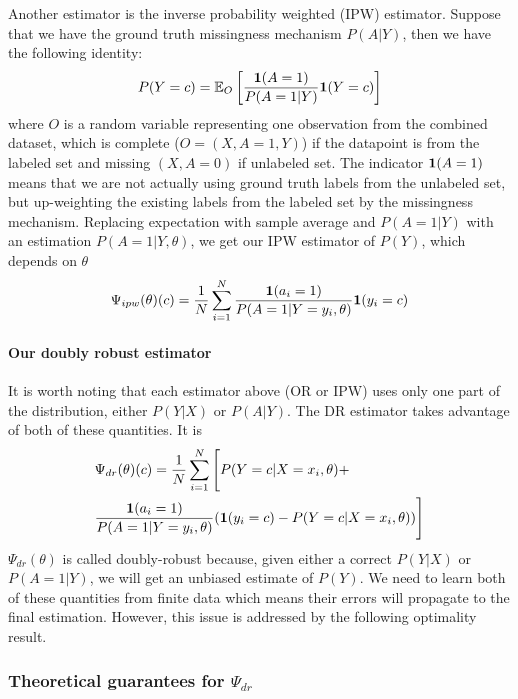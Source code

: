 Another estimator is the inverse probability weighted (IPW) estimator. Suppose that we have the ground truth missingness mechanism $P(A|Y)$, then we have the following identity:
\begin{equation}
P(Y=c) = \mathbb{E}_O\left[\frac{\textbf{1}(A=1)}{P(A=1|Y)} \textbf{1}(Y=c)\right]
\end{equation}
where $O$ is a random variable representing one observation from the combined dataset, which is complete ($O=(X,A=1,Y)$) if the datapoint is from the labeled set and missing $(X,A=0)$ if unlabeled set. The indicator $\textbf{1}(A=1)$ means that we are not actually using ground truth labels from the unlabeled set, but up-weighting the existing labels from the labeled set by the missingness mechanism. Replacing expectation with sample average and $P(A=1|Y)$ with an estimation $P(A=1|Y,\theta)$, we get our IPW estimator of $P(Y)$, which depends on $\theta$
\begin{equation}
\Psi_{ipw}(\theta)(c) = \frac{1}{N}\sum_{i=1}^N \frac{\textbf{1}(a_i=1)}{P(A=1|Y=y_i,\theta)}\textbf{1}(y_i=c)
\end{equation}


\noindent
\vspace*{-.3in}
\paragraph{Our doubly robust estimator}
It is worth noting that each estimator above (OR or IPW) uses only one part of the distribution, either $P(Y|X)$ or $P(A|Y)$. The DR estimator takes advantage of both of these quantities. It is
\vspace*{-.1in}
\begin{equation}
\label{eq:dr}
\begin{aligned}
&\Psi_{dr}(\theta)(c) = \frac{1}{N}\sum_{i=1}^N\Bigg[ P(Y=c|X=x_i,\theta) + \\
&\frac{\textbf{1}(a_i=1)}{P(A=1|Y=y_i,\theta)}( \textbf{1}(y_i=c) - P(Y=c|X=x_i,\theta) )\Bigg]
\end{aligned}
\end{equation}
$\Psi_{dr}(\theta)$ is called doubly-robust because, given either a correct $P(Y|X)$ or $P(A=1|Y)$, we will get an unbiased estimate of $P(Y)$. 
We need to learn both of these quantities from finite data which means their errors will propagate to the final estimation. However, this issue is addressed by the following optimality result.

\subsubsection{Theoretical guarantees for $\Psi_{dr}$}

